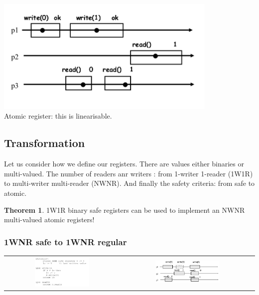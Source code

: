 \documentclass{article}
\theoremstyle{definition}
\newtheorem{theorem}{Theorem}
\begin{document}
\begin{center}
\includegraphics[width=0.8\textwidth]{c3_p3}\\
Atomic register: this is linearisable.
\end{center}


\subsection{Transformation}

Let us consider how we define our registers. There are values either binaries or multi-valued. The number of readers anr writers : from 1-writer 1-reader (1W1R) to multi-writer multi-reader (NWNR). And finally the safety criteria: from safe to atomic.

\begin{theorem}
1W1R binary safe registers can be used to implement an NWNR multi-valued atomic registers!
\end{theorem}

\subsubsection{1WNR safe to 1WNR regular}

\begin{center}
\begin{tabular}{c c}
\includegraphics[width=0.5\textwidth]{transfo1}&
\includegraphics[width=0.5\textwidth]{transfo1_des}
\end{tabular}
\end{center}
\end{document}
